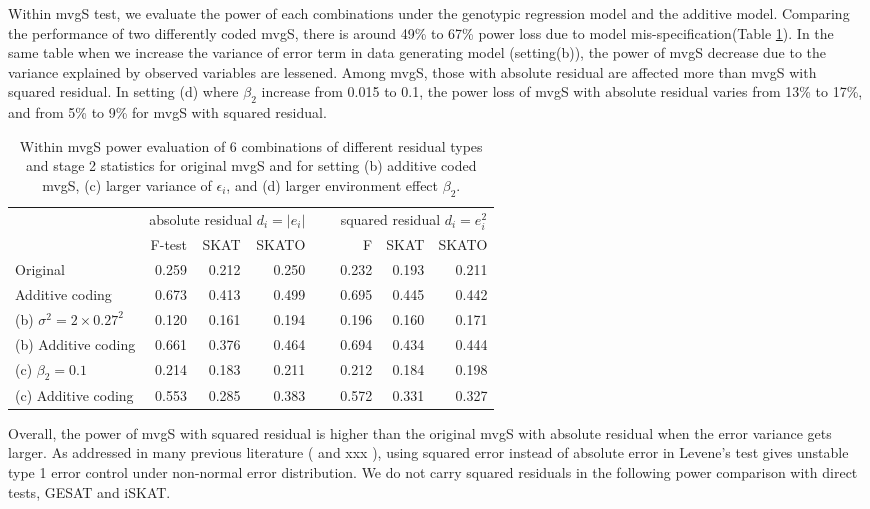\documentclass{article}
\begin{document}
Within mvgS test, we evaluate the power of each combinations under the genotypic regression model and the additive model. Comparing the performance of two differently coded mvgS, there is around  49\% to 67\% power loss due to model mis-specification(Table \ref{tab:internalpower}). In the same table when we increase the variance of error term in data generating model (setting(b)), the power of mvgS decrease due to the variance explained by observed variables are lessened. Among mvgS, those with absolute residual are affected more than mvgS with squared residual.   In setting (d) where $\beta_2$ increase from 0.015 to 0.1, the power loss of mvgS with absolute residual varies from 13\% to 17\%, and from 5\% to 9\% for mvgS with squared residual. 


\begin{table}[htb!]
\centering
\begin{tabular}{lrrrrrrr}
  \hline
   & \multicolumn{3}{c}{absolute residual $d_i=|e_i|$ }&\ & \multicolumn{3}{c}{squared residual $d_i=e_i^2$}\\
   \cline{2-4}\cline{6-8}  		
  & F-test & SKAT & SKATO && F & SKAT & SKATO \\ 
  \hline
Original  & 0.259 & 0.212 & 0.250 & &0.232 & 0.193 & 0.211 \\ 
Additive coding & 0.673 & 0.413 & 0.499 && 0.695 & 0.445 & 0.442 \\ 
(b)	$\sigma^2=2\times 0.27^2$  &  0.120& 0.161& 0.194&& 0.196& 0.160& 0.171   \\ 
(b) Additive coding  & 0.661& 0.376& 0.464&& 0.694& 0.434& 0.444 \\
(c) $\beta_2=0.1$ &0.214& 0.183& 0.211&& 0.212&0.184& 0.198  \\
(c) Additive coding & 0.553&  0.285& 0.383&& 0.572& 0.331& 0.327  \\
   \hline
   
\end{tabular}

\caption{Within mvgS power evaluation of 6 combinations of different residual types and stage 2 statistics for original mvgS and for setting (b) additive coded mvgS, (c) larger variance of $\epsilon_i$, and (d) larger environment effect $\beta_2$.}
\label{tab:internalpower}
\end{table}


 Overall, the power of mvgS with squared residual is higher than the original mvgS with absolute residual when the error variance gets larger. As addressed in many previous literature (\cite{loh1987some} and xxx ), using squared error instead of absolute error in Levene's test gives unstable type 1 error control under non-normal error distribution. We do not carry squared residuals in the following power comparison with direct tests, GESAT and iSKAT.
 
\end{document}
